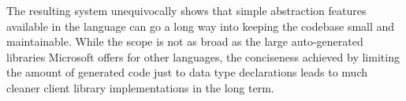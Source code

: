 \documentclass[11pt]{report}
\begin{document}
The resulting system unequivocally shows that simple abstraction features
available in the language can go a long way into keeping the codebase small
and maintainable. While the scope is not as broad as the large auto-generated
libraries Microsoft offers for other languages, the conciseness achieved
by limiting the amount of generated code just to data type declarations leads
to much cleaner client library implementations in the long term.

\nocite{*}


\end{document}
